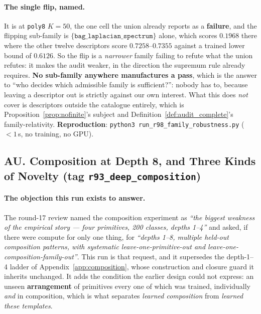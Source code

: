 \paragraph{The single flip, named.} It is at \texttt{poly8} $K{=}50$, the one cell the union already reports as a \textbf{failure}, and the flipping sub-family is $\{\texttt{bag\_laplacian\_spectrum}\}$ alone, which scores $0.1968$ there where the other twelve descriptors score $0.7258$--$0.7355$ against a trained lower bound of $0.6126$. So the flip is a \emph{narrower} family failing to refute what the union refutes: it makes the audit weaker, in the direction the supremum rule already requires. \textbf{No sub-family anywhere manufactures a pass}, which is the answer to ``who decides which admissible family is sufficient?'': nobody has to, because leaving a descriptor out is strictly against our own interest. What this does \emph{not} cover is descriptors outside the catalogue entirely, which is Proposition~\ref{prop:nofinite}'s subject and Definition~\ref{def:audit_complete}'s family-relativity. \textbf{Reproduction}: \texttt{python3 run\_r98\_family\_robustness.py} ($<1$\,s, no training, no GPU).

\subsection*{AU. Composition at Depth 8, and Three Kinds of Novelty (tag \texttt{r93\_deep\_composition})}

\paragraph{The objection this run exists to answer.} The round-17 review named the composition experiment as \emph{``the biggest weakness of the empirical story --- four primitives, 200 classes, depths 1--4''} and asked, if there were compute for only one thing, for \emph{``depths 1--8, multiple held-out composition patterns, with systematic leave-one-primitive-out and leave-one-composition-family-out''}. This run is that request, and it supersedes the depth-1--4 ladder of Appendix~\ref{app:composition}, whose construction and closure guard it inherits unchanged. It adds the condition the earlier design could not express: an unseen \textbf{arrangement} of primitives every one of which was trained, individually \emph{and} in composition, which is what separates \emph{learned composition} from \emph{learned these templates}.

